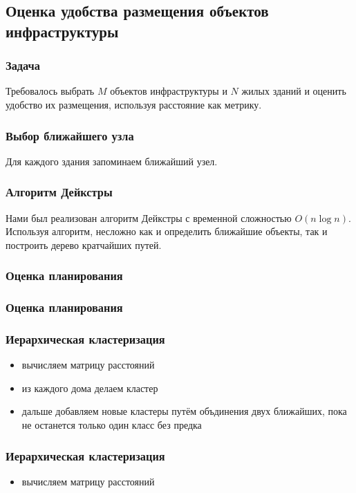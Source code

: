 \documentclass{beamer}
\begin{document}
\subsection{Оценка удобства размещения объектов инфраструктуры}
\begin{frame}
\frametitle{Задача}
Требовалось выбрать $ M $ объектов инфраструктуры и $ N $ жилых зданий и оценить удобство их размещения, используя расстояние как метрику.

\end{frame}
    
\begin{frame}
\frametitle{Выбор ближайшего узла}
Для каждого здания запоминаем ближайший узел.

\end{frame}

\begin{frame}
\frametitle{Алгоритм Дейкстры}
Нами был реализован алгоритм Дейкстры с временной сложностью $ O(n \log n) $.\\
Используя алгоритм, несложно как и определить ближайшие объекты, так и построить дерево кратчайших путей.
\end{frame}

\begin{frame}
\frametitle{Оценка планирования}

\end{frame}

\begin{frame}
\frametitle{Оценка планирования}

\end{frame}

\begin{frame}
	\frametitle{Иерархическая кластеризация}
	\begin{itemize}
		\item вычисляем матрицу расстояний
		\item из каждого дома делаем кластер
		\item дальше добавляем новые кластеры путём объдинения двух ближайших, пока не останется только один класс без предка
	\end{itemize}
\end{frame}

\begin{frame}
	\frametitle{Иерархическая кластеризация}
	\begin{itemize}
		\item вычисляем матрицу расстояний
	\end{itemize}
\end{frame}
\end{document}
